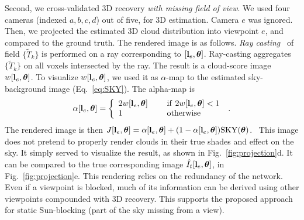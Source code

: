 \documentclass[runningheads]{llncs}
\begin{document}
Second, we cross-validated 3D recovery {\em with missing field of view}. We used four cameras (indexed $a,b,c,d$) out of five, for 3D estimation. Camera $e$ was ignored. Then, we projected the estimated 3D cloud distribution into viewpoint $e$, and compared to the ground truth. The rendered image is as follows. {\em Ray casting}~\cite{Levoy1990} of  field $\{\tilde T_k\}$ is performed on a ray corresponding to
$[{\bf l}_e,{\bm \theta}]$. Ray-casting aggregates $\{\tilde T_k\}$ on all voxels intersected by the ray. The result is a cloud-score image $w[{\bf l}_e,{\bm \theta}]$.
To visualize $w[{\bf l}_e,{\bm \theta}]$, we used it as $\alpha$-map to the estimated sky-background image (Eq.~\ref{eq:SKY}). The alpha-map is
\begin{equation}
 \alpha[{\bf l}_e,{\bm \theta}]=\left\{
      \begin{array}{ll}
      2w[{\bf l}_e,{\bm \theta}]
      & ~~~~{\rm if}~ 2w[{\bf l}_e,{\bm \theta}]<1 \\
      1
      & ~~~~{\rm otherwise}
      \end{array}
      \right.
  \;.
 \label{eq:alpha}
\end{equation}
The rendered image is then
 $J[{\bf l}_e,{\bm \theta}]=
 \alpha[{\bf l}_e,{\bm \theta}]+(1-\alpha[{\bf l}_e,{\bm \theta}]){\rm SKY}({\bm \theta})$.~
This image does not pretend to properly render clouds in their true shades and effect on the sky. It simply served to visualize the result, as shown in Fig.~\ref{fig:projection}d. It can be compared to the true corresponding image $\hat I_t[{\bf l}_e,{\bm \theta}]$, in Fig.~\ref{fig:projection}e.
This rendering relies on the redundancy of the network. Even if a viewpoint is blocked, much of its information can be derived using other viewpoints compounded with 3D recovery. This supports the proposed approach for static Sun-blocking (part of the sky missing from a view).
\end{document}
